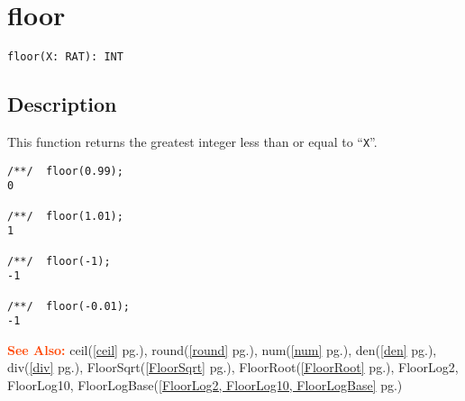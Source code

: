 \documentclass[a4paper]{mybook}
\newenvironment{command}{}{} %
\newcommand\SeeAlso{\par\textcolor{OrangeRed}{\textbf{\large See Also: }}}
\begin{document}
\section{floor}
\label{floor}
\begin{command} %


\begin{Verbatim}[label=syntax, rulecolor=\color{MidnightBlue},
frame=single]
floor(X: RAT): INT
\end{Verbatim}


\subsection*{Description}

This function returns the greatest integer less than or equal to ``\verb&X&''.
\begin{Verbatim}[label=example, rulecolor=\color{PineGreen}, frame=single]
/**/  floor(0.99);
0

/**/  floor(1.01);
1

/**/  floor(-1);
-1

/**/  floor(-0.01);
-1
\end{Verbatim}


\SeeAlso %
  ceil(\ref{ceil} pg.\pageref{ceil}), 
    round(\ref{round} pg.\pageref{round}), 
    num(\ref{num} pg.\pageref{num}), 
    den(\ref{den} pg.\pageref{den}), 
    div(\ref{div} pg.\pageref{div}), 
    FloorSqrt(\ref{FloorSqrt} pg.\pageref{FloorSqrt}), 
    FloorRoot(\ref{FloorRoot} pg.\pageref{FloorRoot}), 
    FloorLog2, FloorLog10, FloorLogBase(\ref{FloorLog2, FloorLog10, FloorLogBase} pg.\pageref{FloorLog2, FloorLog10, FloorLogBase})
\end{command} %
\end{document}
